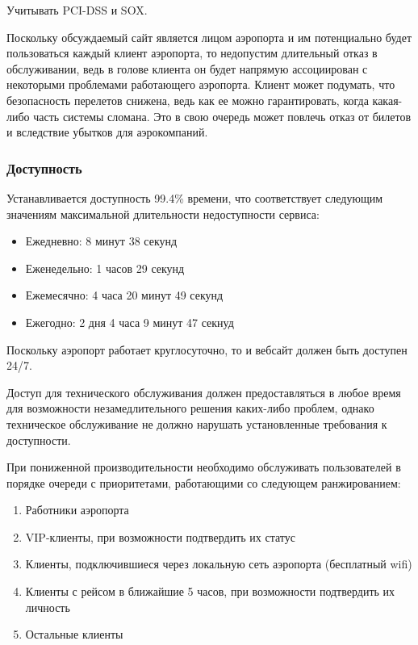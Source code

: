 Учитывать PCI-DSS и SOX.

Поскольку обсуждаемый сайт является лицом
аэропорта и им потенциально будет пользоваться
каждый клиент аэропорта, то недопустим
длительный отказ в обслуживании, ведь
в голове клиента он будет напрямую ассоциирован
с некоторыми проблемами работающего аэропорта.
Клиент может подумать, что безопасность перелетов
снижена, ведь как ее можно гарантировать, когда
какая-либо часть системы сломана. Это в свою очередь
может повлечь отказ от билетов и вследствие
убытков для аэрокомпаний.

\subsubsection{Доступность}

Устанавливается доступность 99.4\% времени,
что соответствует следующим значениям максимальной
длительности недоступности сервиса:
\begin{itemize}
      \item Ежедневно:   8 минут 38 секунд
      \item Еженедельно: 1 часов 29 секунд
      \item Ежемесячно:  4 часа 20 минут 49 секунд
      \item Ежегодно:    2 дня 4 часа 9 минут 47 секнуд
\end{itemize}

Поскольку аэропорт работает круглосуточно, то
и вебсайт должен быть доступен 24/7.

Доступ для технического обслуживания должен
предоставляться в любое время для возможности
незамедлительного решения каких-либо проблем,
однако техническое обслуживание не должно
нарушать установленные требования к доступности.

При пониженной производительности необходимо
обслуживать пользователей в порядке очереди
с приоритетами, работающими со следующем
ранжированием:
\begin{enumerate}
      \item Работники аэропорта
      \item VIP-клиенты, при возможности
            подтвердить их статус
      \item Клиенты, подключившиеся через
            локальную сеть аэропорта (бесплатный wifi)
      \item Клиенты с рейсом в ближайшие 5 часов,
            при возможности подтвердить их личность
      \item Остальные клиенты
\end{enumerate}

